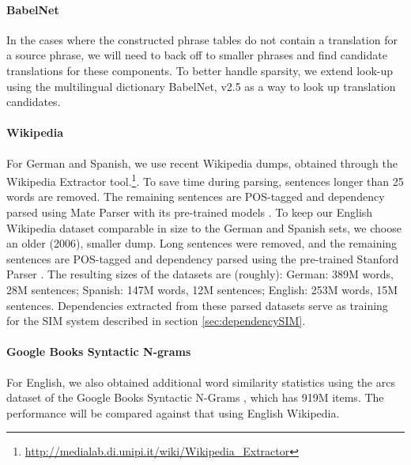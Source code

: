 \documentclass[11pt]{article}
\begin{document}
\paragraph{BabelNet} %

In the cases where the constructed phrase tables do not contain a translation for a source phrase, we will need to back off to smaller phrases and find candidate translations for these components.  To better handle sparsity, we extend look-up using the multilingual dictionary BabelNet, v2.5 \cite{Navigli:Ponzetto:12} as a way to look up translation candidates.

\paragraph{Wikipedia} %


For German and Spanish, we use recent Wikipedia dumps, obtained through the Wikipedia Extractor tool.\footnote{\url{http://medialab.di.unipi.it/wiki/Wikipedia_Extractor}}. To save time during parsing, sentences longer than 25 words are removed. The remaining sentences are POS-tagged and dependency parsed using Mate Parser with its pre-trained models \cite{bohnet:10,bohnet:kuhn:12,seeker:kuhn:13}. To keep our English Wikipedia dataset comparable in size to the German and Spanish sets, we choose an older (2006), smaller dump. Long sentences were removed, and the remaining sentences are POS-tagged and dependency parsed using the pre-trained Stanford Parser \cite{klein:manning:03,marneffe:maccartney:ea:06}. The resulting sizes of the datasets are (roughly): German: 389M words, 28M sentences; Spanish: 147M words, 12M sentences; English: 253M words, 15M sentences. Dependencies extracted from these parsed datasets serve as training for the SIM system described in section \ref{sec:dependencySIM}.

\paragraph{Google Books Syntactic N-grams}

For English, we also obtained additional word similarity statistics using the arcs dataset of the Google Books Syntactic N-Grams \cite{goldberg:orwant:13}, which has 919M items. The performance will be compared against that using English Wikipedia. 
 
\end{document}
